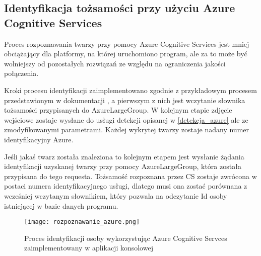 \subsection{Identyfikacja tożsamości przy użyciu Azure Cognitive Services}
Proces rozpoznawania twarzy przy pomocy Azure Cognitive Services jest mniej obciążający dla platformy, na której uruchomiono program, ale za to może być wolniejszy od pozostałych rozwiązań ze względu na ograniczenia jakości połączenia.

Kroki procesu identyfikacji zaimplementowano zgodnie z przykładowym procesem przedstawionym w dokumentacji \cite{acs_doc}, a pierwszym z nich jest wczytanie słownika tożsamości przypisanych do AzureLargeGroup. W kolejnym etapie zdjęcie wejściowe zostaje wysłane do usługi detekcji opisanej w \ref{detekcja_azure} ale ze zmodyfikowanymi parametrami. Każdej wykrytej twarzy zostaje nadany numer identyfikacyjny Azure. 

Jeśli jakaś twarz została znaleziona to kolejnym etapem jest wysłanie żądania identyfikacji uzyskanej twarzy przy pomocy AzureLargeGroup, która została przypisana do tego requesta. Tożsamość rozpoznana przez CS zostaje zwrócona w postaci numera identyfikacyjnego usługi, dlatego musi ona zostać porównana z wcześniej wczytanym słownikiem, który pozwala na odczytanie Id osoby istniejącej w bazie danych programu.
\begin{figure}[H]
	\centering
	\texttt{[image: rozpoznawanie\_azure.png]}
	\caption{Proces identyfikacji osoby wykorzystując Azure Cognitive Servces zaimplementowany w aplikacji konsolowej}
	\label{fig:rozpoznawanie_azure}
\end{figure}
